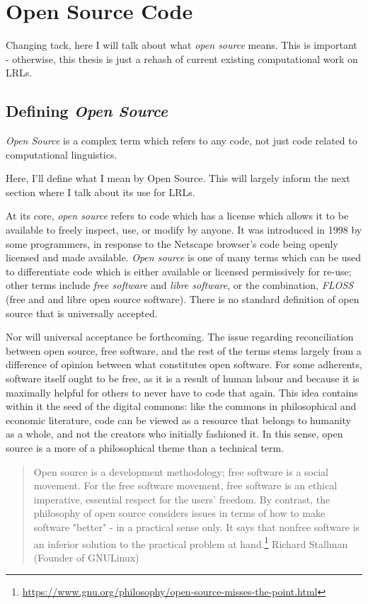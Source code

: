 \section{Open Source Code}\label{sec:open-source}

Changing tack, here I will talk about what \emph{open source} means. This is important - otherwise, this thesis is just a rehash of current existing computational work on LRLs.

\subsection{Defining {\it Open Source}}

{\it Open Source} is a complex term which refers to any code, not just code related to computational linguistics.

Here, I'll define what I mean by Open Source. This will largely inform the next section where I talk about its use for LRLs.

At its core, {\it open source} refers to code which has a license which allows it to be available to freely inspect, use, or modify by anyone. It was introduced in 1998 by some programmers, in response to the Netscape browser's code being openly licensed and made available. {\it Open source} is one of many terms which can be used to differentiate code which is either available or licensed permissively for re-use; other terms include {\it free software} and {\it libre software}, or the combination, {\it FLOSS} (free and and libre open source software). There is no standard definition of open source that is universally accepted.

Nor will universal acceptance be forthcoming. The issue regarding reconciliation between open source, free software, and the rest of the terms stems largely from a difference of opinion between what constitutes open software. For some adherents, software itself ought to be free, as it is a result of human labour and because it is maximally helpful for others to never have to code that again. This idea contains within it the seed of the digital commons: like the commons in philosophical and economic literature, code can be viewed as a resource that belongs to humanity as a whole, and not the creators who initially fashioned it. In this sense, open source is a more of a philosophical theme than a technical term.

\begin{quote}
Open source is a development methodology; free software is a social movement. For the free software movement, free software is an ethical imperative, essential respect for the users' freedom. By contrast, the philosophy of open source considers issues in terms of how to make software  "better" - in a practical sense only. It says that nonfree software is an inferior solution to the practical problem at hand.\footnote{\href{https://www.gnu.org/philosophy/open-source-misses-the-point.html}{https://www.gnu.org/philosophy/open-source-misses-the-point.html}}
\signed Richard Stallman (Founder of GNU\/Linux)
\end{quote}

